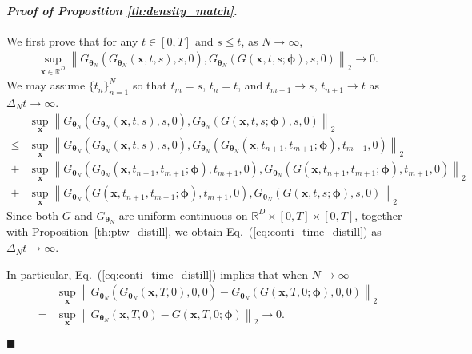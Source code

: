\documentclass{article} \usepackage{iclr2024_coNFErence,times}
\def\eqref#1{equation~\ref{#1}}
\newcommand{\norm}[1]{\left\lVert#1\right\rVert}
\newenvironment{myproof}[2]{\paragraph{\textit{Proof of {#1} {#2}. }}}{\hfill$\blacksquare$}
\def\eqref#1{(\ref{#1})}
\def\eqref#1{(\ref{#1})}
\theoremstyle{definition}
\theoremstyle{remark}
\begin{document}
\begin{myproof}{Proposition}{\ref{th:density_match}}
    We first prove that for any $t\in[0,T]$ and $s\leq t$, as $N\rightarrow\infty$,
    \begin{align}\label{eq:conti_time_distill}
    \sup_{\mathbf{x}\in\mathbb{R}^D} \norm{G_{\bm{\theta}_N}(G_{\bm{\theta}_N}(\mathbf{x}, t, s), s, 0) ,G_{\bm{\theta}_N}(G(\mathbf{x}, t, s; \bm{\phi}), s, 0)}_2 \rightarrow 0.
\end{align}
      We may assume $\{t_n \}_{n=1}^N$ so that $t_m = s$, $t_n=t$, and $t_{m+1} \rightarrow s$, $t_{n+1} \rightarrow t$ as $\Delta_N t \rightarrow \infty$.
    \begin{align*}
        &\sup_{\mathbf{x}}\norm{G_{\bm{\theta}_N}(G_{\bm{\theta}_N}(\mathbf{x}, t, s), s, 0) ,G_{\bm{\theta}_N}(G(\mathbf{x}, t, s; \bm{\phi}), s, 0)}_2  
        \\ \leq &\sup_{\mathbf{x}} \norm{G_{\bm{\theta}_N}(G_{\bm{\theta}_N}(\mathbf{x}, t, s), s, 0) ,G_{\bm{\theta}_N}(G_{\bm{\theta}_N}(\mathbf{x}, t_{n+1}, t_{m+1}; \bm{\phi}), t_{m+1}, 0)}_2 
        \\ + &\sup_{\mathbf{x}} \norm{G_{\bm{\theta}_N}(G_{\bm{\theta}_N}(\mathbf{x}, t_{n+1}, t_{m+1}; \bm{\phi}), t_{m+1}, 0) ,G_{\bm{\theta}_N}(G(\mathbf{x}, t_{n+1}, t_{m+1}; \bm{\phi}), t_{m+1}, 0)}_2 
        \\ + & \sup_{\mathbf{x}} \norm{G_{\bm{\theta}_N}(G(\mathbf{x}, t_{n+1}, t_{m+1}; \bm{\phi}), t_{m+1}, 0) ,G_{\bm{\theta}_N}(G(\mathbf{x}, t, s; \bm{\phi}), s, 0)}_2
    \end{align*}
Since both $G$ and $G_{\bm{\theta}_N}$ are uniform continuous on $\mathbb{R}^D\times[0, T]\times[0, T]$, together with Proposition~\ref{th:ptw_distill}, we obtain Eq.~\eqref{eq:conti_time_distill} as $\Delta_N t \rightarrow \infty$.

     In particular, Eq.~\eqref{eq:conti_time_distill} implies that when $N\rightarrow\infty$
    \begin{align*}
    &\sup_{\mathbf{x}}\norm{G_{\bm{\theta}_N}
    (G_{\bm{\theta}_N}(\mathbf{x}, T, 0), 0, 0) - G_{\bm{\theta}_N}(G(\mathbf{x}, T, 0; \bm{\phi}), 0, 0)}_2 
    \\= &\sup_{\mathbf{x}}\norm{G_{\bm{\theta}_N}(\mathbf{x}, T, 0) - G(\mathbf{x}, T, 0; \bm{\phi})}_2\rightarrow 0.
    \end{align*}
    

\end{myproof}
\end{document}
